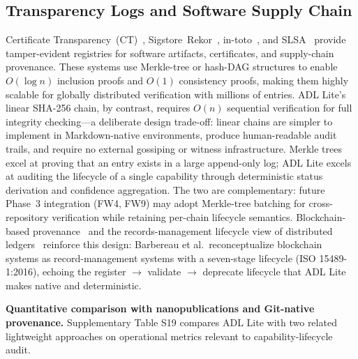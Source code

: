 \subsection{Transparency Logs and Software Supply Chain}\label{subsec:transparency-logs}

Certificate Transparency~(CT)~\cite{rfc6962,crosby_wallach}, Sigstore~Rekor~\cite{sigstore2022}, in-toto~\cite{in_toto}, and SLSA~\cite{slsa} provide tamper-evident registries for software artifacts, certificates, and supply-chain provenance. These systems use Merkle-tree or hash-DAG structures to enable $O(\log n)$ inclusion proofs and $O(1)$ consistency proofs, making them highly scalable for globally distributed verification with millions of entries. ADL Lite's linear SHA-256 chain, by contrast, requires $O(n)$ sequential verification for full integrity checking---a deliberate design trade-off: linear chains are simpler to implement in Markdown-native environments, produce human-readable audit trails, and require no external gossiping or witness infrastructure. Merkle trees excel at proving that an entry exists in a large append-only log; ADL Lite excels at auditing the lifecycle of a single capability through deterministic status derivation and confidence aggregation. The two are complementary: future Phase~3 integration (FW4, FW9) may adopt Merkle-tree batching for cross-repository verification while retaining per-chain lifecycle semantics. Blockchain-based provenance~\cite{akbarfam2024blockchain} and the records-management lifecycle view of distributed ledgers~\cite{barbereau2026lifecycle} reinforce this design: Barbereau et al.\ reconceptualize blockchain systems as record-management systems with a seven-stage lifecycle (ISO 15489-1:2016), echoing the register $\to$ validate $\to$ deprecate lifecycle that ADL Lite makes native and deterministic.\par
\textbf{Quantitative comparison with nanopublications and Git-native provenance.} Supplementary Table S19 compares ADL Lite with two related lightweight approaches on operational metrics relevant to capability-lifecycle audit.

